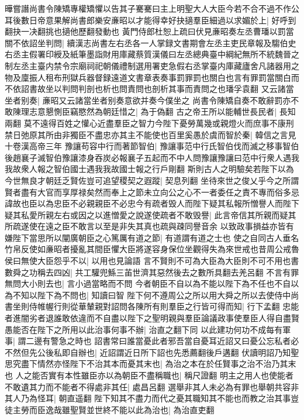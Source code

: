 曄嘗譖尚書令陳矯專權矯懼以告其子騫騫曰主上明聖大人大臣今若不合不過不作公耳後數日帝意果解尚書郎樂安亷昭以才能得幸好抉擿羣臣細過以求媚於上|{
	好呼到翻抉一决翻挑也擿他歷翻發動也}
黃門侍郎杜恕上疏曰伏見亷昭奏左丞曹璠以罰當關不依詔坐判問|{
	續漢志尚書左右丞各一人掌録文書期會左丞主吏民章報及騶伯史右丞主假署印綬及紙筆墨詣財用庫藏蔡質漢儀曰左丞總典臺中綱紀無所不統魏晉之制左丞主臺内禁令宗廟祠祀朝儀禮制選用署吏急假右丞掌臺内庫藏廬舍凡諸器用之物及廩振人租布刑獄兵器督録遠道文書章表奏事罰罪罰也關白也言有罪罰當關白而不依詔書故坐以判問判剖也析也問責問也剖析其事而責問之也璠孚袁翻}
又云諸當坐者别奏|{
	亷昭又云諸當坐者别奏意欲并奏今僕坐之}
尚書令陳矯自奏不敢辭罰亦不敢陳理志意懇惻臣竊愍然為朝廷惜之|{
	為于偽翻}
古之帝王所以能輔世長民者|{
	長知兩翻}
莫不遠得百姓之懽心近盡羣臣之智力今陛下憂勞萬幾或親燈火而庶事不康刑禁日弛原其所由非獨臣不盡忠亦其主不能使也百里奚愚於虞而智於秦|{
	韓信之言見十卷漢高帝三年}
豫讓苟容中行而著節智伯|{
	豫讓事范中行氏智伯伐而滅之移事智伯後趙襄子滅智伯豫讓漆身吞炭必報襄子五起而不中人問豫讓豫讓曰范中行衆人遇我我故衆人報之智伯國士遇我我故國士報之行戶剛翻}
斯則古人之明驗矣若陛下以為今世無良才朝廷乏賢佐豈可追望稷契之遐蹤|{
	契息列翻}
坐待來世之俊乂乎今之所謂賢者盡有大官而享厚禄矣然而奉上之節未立向公之心不一者委任之責不專而俗多忌諱故也臣以為忠臣不必親親臣不必忠今有疏者毁人而陛下疑其私報所憎譽人而陛下疑其私愛所親左右或因之以進憎愛之說遂使疏者不敢毁譽|{
	此言帝信其所親而疑其所疏遂使在遠之臣不敢言以至是非失其真也疏與疎同譽音余}
以致政事損益亦皆有嫌陛下當思所以闡廣朝臣之心篤厲有道之節|{
	有道謂有道之士也}
使之自同古人垂名竹帛反使如亷昭者擾亂其間臣懼大臣將遂容身保位坐觀得失為來世戒也昔周公戒魯侯曰無使大臣怨乎不以|{
	以用也見論語}
言不賢則不可為大臣為大臣則不可不用也書數舜之功稱去四凶|{
	共工驩兜鯀三苖世濟其惡然後去之數所具翻去羌呂翻}
不言有罪無問大小則去也|{
	言小過當略而不問}
今者朝臣不自以為不能以陛下為不任也不自以為不知以陛下為不問也|{
	知讀曰智}
陛下何不遵周公之所以用大舜之所以去使侍中尚書坐則侍帷幄行則從華輦親對詔問各陳所有則羣臣之行皆可得而知|{
	行下孟翻}
忠能者進闇劣者退誰敢依違而不自盡以陛下之聖明親與羣臣論議政事使羣臣人得自盡賢愚能否在陛下之所用以此治事何事不辦|{
	治直之翻下同}
以此建功何功不成每有軍事|{
	謂二邊有警急之時也}
詔書常曰誰當憂此者邪吾當自憂耳近詔又曰憂公忘私者必不然但先公後私即自辦也|{
	近詔謂近日所下詔也先悉薦翻後戶遘翻}
伏讀明詔乃知聖思究盡下情然亦怪陛下不治其本而憂其末也|{
	為治之本在於任賢事之治不治乃其末也}
人之能否實有本性雖臣亦以為朝臣不盡稱職也|{
	稱尺證翻}
明主之用人也使能者不敢遺其力而不能者不得處非其任|{
	處昌呂翻}
選舉非其人未必為有罪也舉朝共容非其人乃為怪耳|{
	朝直遥翻}
陛下知其不盡力而代之憂其職知其不能也而教之治其事豈徒主勞而臣逸哉雖聖賢並世終不能以此為治也|{
	為治直吏翻}
